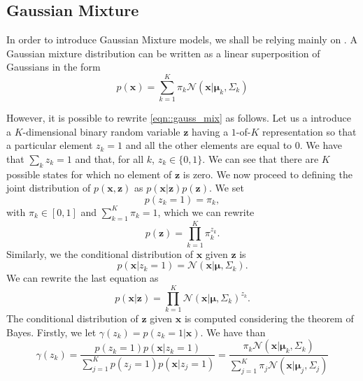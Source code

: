 \documentclass[a4paper]{article}
\begin{document}
	\subsection{Gaussian Mixture}
	In order to introduce Gaussian Mixture models, we shall be relying mainly on \cite{Bishop:2006}.
	A Gaussian mixture distribution can be written as a linear superposition of Gaussians in the form
	\begin{equation}\label{eqn::gauss_mix}
	p(\boldsymbol{x}) = \sum_{k=1}^{K} \pi_{k} \mathcal{N} \left( \boldsymbol{x}  | \boldsymbol{\mu}_{k}, \Sigma_{k} \right)
 	\end{equation}

 	However, it is possible to rewrite \eqref{eqn::gauss_mix} as follows. Let us a introduce a $K$-dimensional binary random variable $\boldsymbol{z}$ having a $1$-of-$K$ representation so that a particular element $z_{k}=1$ and all the other elements are equal to $0$. We have that $\sum_{k} z_{k} = 1$ and that, for all $k$, $z_{k} \in \{ 0, 1 \}$. We can see that there are $K$ possible states for which no element of $\boldsymbol{z}$ is zero.
 	We now proceed to defining the joint distribution of $p(\boldsymbol{x}, \boldsymbol{z})$ as $p(\boldsymbol{x}|\boldsymbol{z})p(\boldsymbol{z})$.
 	We set
 	\begin{equation*}
 	p(z_{k} = 1) = \pi_{k},
 	\end{equation*}
 	with $ \pi_{k} \in \left[0,1 \right] $ and $\sum_{k=1}^{K} \pi_{k} = 1 $, which we can rewrite
 	\begin{equation*}
 	p(\boldsymbol{z}) = \prod_{k=1}^{K} \pi_{k}^{z_{k}}.
 	\end{equation*}
 	Similarly, we the conditional distribution of $\boldsymbol{x}$ given $\boldsymbol{z}$ is
 	\begin{equation*}
 	p(\boldsymbol{x}|z_{k} = 1) = \mathcal{N} \left( \boldsymbol{x} | \boldsymbol{\mu}, \Sigma_{k} \right).
 	\end{equation*}
 	We can rewrite the last equation as
 	\begin{equation*}
 	p(\boldsymbol{x}|\boldsymbol{z}) = \prod_{k=1}^{K} \mathcal{N} (\boldsymbol{x} | \boldsymbol{\mu}, \Sigma_{k})^{z_{k}}.
 	\end{equation*}
 	The conditional distribution of $\boldsymbol{z}$ given $\boldsymbol{x}$ is computed considering the theorem of Bayes. Firstly, we let $\gamma(z_{k})= p(z_{k}=1 | \boldsymbol{x})$. We have than
 	\begin{equation}\label{eqn::posterior}
 	\gamma(z_{k}) = \frac{p(z_{k}=1)p(\boldsymbol{x}|z_{k} = 1)}{\sum_{j=1}^{K} p(z_{j}=1)p(\boldsymbol{x}|z_{j} = 1)}
 	= \frac{\pi_{k}\mathcal{N}(\boldsymbol{x}|\boldsymbol{\mu}_{k}, \Sigma_{k})}{\sum_{j=1}^{K} \pi_{j}\mathcal{N}(\boldsymbol{x}|\boldsymbol{\mu}_{j}, \Sigma_{j})}
 	\end{equation}
\end{document}
